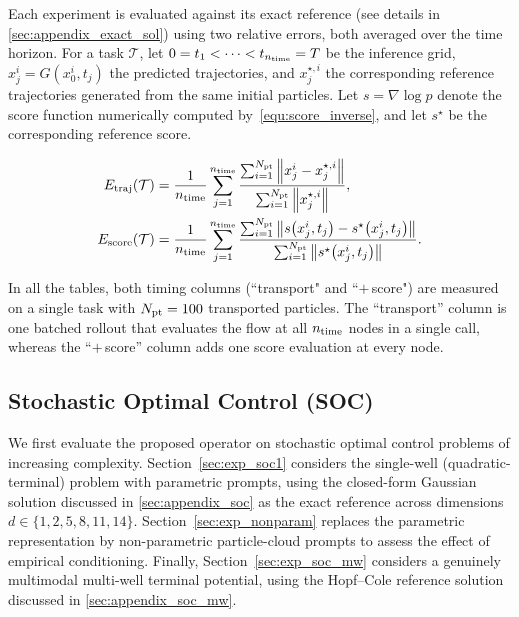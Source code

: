 \documentclass[preprint]{elsarticle}
\newcommand{\sT}{\mathcal{T}}
\begin{document}
\label{sec:exp_metrics}
Each experiment is evaluated against its exact reference (see details in \ref{sec:appendix_exact_sol}) using two relative errors, both averaged over the time horizon. For a task $\sT$, let $0=t_1<\cdots<t_{n_{\rm time}}=T$ be the inference grid, $x_j^i=G(x_0^i,t_j)$ the predicted trajectories, and $x_j^{\star,i}$ the corresponding reference trajectories generated from the same initial particles. Let $s=\nabla\log p$ denote the score function numerically computed by~\eqref{equ:score_inverse}, and let $s^\star$ be the corresponding reference score.

\begin{align}
  E_{\rm traj}(\sT) &= \frac{1}{n_{\rm time}}\sum_{j=1}^{n_{\rm time}}
    \frac{\sum_{i=1}^{N_{\rm pt}}\norm{x^{i}_{j}-x^{\star,i}_{j}}}
         {\sum_{i=1}^{N_{\rm pt}}\norm{x^{\star,i}_{j}}},
    \label{equ:err_traj}\\
  E_{\rm score}(\sT) &= \frac{1}{n_{\rm time}}\sum_{j=1}^{n_{\rm time}}
    \frac{\sum_{i=1}^{N_{\rm pt}}\norm{s\qb{x^{i}_{j},t_j}-s^{\star}\qb{x^{i}_{j},t_j}}}
         {\sum_{i=1}^{N_{\rm pt}}\norm{s^{\star}\qb{x^{i}_{j},t_j}}}.
    \label{equ:err_score}
\end{align}

In all the tables, both timing columns (``transport" and ``$+$\,score") are measured on a single task with $N_{\rm pt}=100$ transported particles. The ``transport'' column is one batched rollout that evaluates the flow at all $n_{\rm time}$ nodes in a single call, whereas the ``$+$\,score'' column adds one score evaluation at every node.

\subsection{Stochastic Optimal Control (SOC)}
\label{sec:exp_soc}

We first evaluate the proposed operator on stochastic optimal control problems of increasing complexity. Section~\ref{sec:exp_soc1} considers the single-well (quadratic-terminal) problem with parametric prompts, using the closed-form Gaussian solution discussed in \ref{sec:appendix_soc} as the exact reference across dimensions $d\in\{1,2,5,8,11,14\}$. Section~\ref{sec:exp_nonparam} replaces the parametric representation by non-parametric particle-cloud prompts to assess the effect of empirical conditioning. Finally, Section~\ref{sec:exp_soc_mw} considers a genuinely multimodal multi-well terminal potential, using the Hopf--Cole reference solution discussed in \ref{sec:appendix_soc_mw}.
\end{document}
